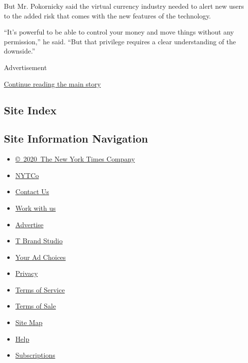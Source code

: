 But Mr. Pokornicky said the virtual currency industry needed to alert
new users to the added risk that comes with the new features of the
technology.

``It's powerful to be able to control your money and move things without
any permission,'' he said. ``But that privilege requires a clear
understanding of the downside.''

Advertisement

\protect\hyperlink{after-bottom}{Continue reading the main story}

\hypertarget{site-index}{%
\subsection{Site Index}\label{site-index}}

\hypertarget{site-information-navigation}{%
\subsection{Site Information
Navigation}\label{site-information-navigation}}

\begin{itemize}
\tightlist
\item
  \href{https://help.nytimes3xbfgragh.onion/hc/en-us/articles/115014792127-Copyright-notice}{©~2020~The
  New York Times Company}
\end{itemize}

\begin{itemize}
\tightlist
\item
  \href{https://www.nytco.com/}{NYTCo}
\item
  \href{https://help.nytimes3xbfgragh.onion/hc/en-us/articles/115015385887-Contact-Us}{Contact
  Us}
\item
  \href{https://www.nytco.com/careers/}{Work with us}
\item
  \href{https://nytmediakit.com/}{Advertise}
\item
  \href{http://www.tbrandstudio.com/}{T Brand Studio}
\item
  \href{https://www.nytimes3xbfgragh.onion/privacy/cookie-policy\#how-do-i-manage-trackers}{Your
  Ad Choices}
\item
  \href{https://www.nytimes3xbfgragh.onion/privacy}{Privacy}
\item
  \href{https://help.nytimes3xbfgragh.onion/hc/en-us/articles/115014893428-Terms-of-service}{Terms
  of Service}
\item
  \href{https://help.nytimes3xbfgragh.onion/hc/en-us/articles/115014893968-Terms-of-sale}{Terms
  of Sale}
\item
  \href{https://spiderbites.nytimes3xbfgragh.onion}{Site Map}
\item
  \href{https://help.nytimes3xbfgragh.onion/hc/en-us}{Help}
\item
  \href{https://www.nytimes3xbfgragh.onion/subscription?campaignId=37WXW}{Subscriptions}
\end{itemize}
